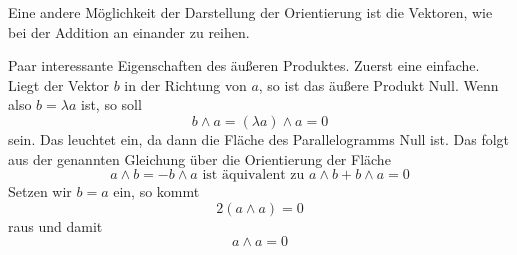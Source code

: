 \documentclass[fleqn]{scrartcl}
\numberwithin{equation}{section}
\begin{document}
Eine andere Möglichkeit der Darstellung der Orientierung ist die Vektoren, wie
bei der Addition an einander zu reihen.
\begin{center}
\begin{minipage}{\linewidth}
\centering
{}
\label{fig:outherProduct2}
\end{minipage}
\end{center}

Paar interessante Eigenschaften des äußeren Produktes. Zuerst eine einfache.
Liegt der Vektor $b$ in der Richtung von $a$, so ist das äußere Produkt Null.
Wenn also $b=\lambda a$ ist, so soll
\[b\wedge a = (\lambda a)\wedge a= 0\]
sein. Das leuchtet ein, da dann die Fläche des Parallelogramms Null ist. Das
folgt aus der genannten Gleichung über die Orientierung der Fläche
\[a\wedge b = - b\wedge a \textrm{ ist äquivalent zu } a\wedge b + b\wedge a = 0\]
Setzen wir $b = a$ ein, so kommt
\[2(a\wedge a)=0\]
raus und damit
\[a\wedge a = 0\]
\end{document}
